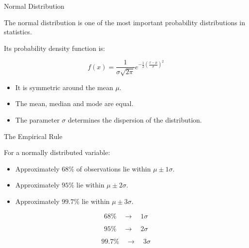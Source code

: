 \documentclass{beamer}
\begin{document}
\begin{frame}{Normal Distribution}

The normal distribution is one of the most important probability distributions in statistics.

\vskip 0.5cm

Its probability density function is:

\[
f(x)=
\frac{1}{\sigma\sqrt{2\pi}}
e^{-\frac{1}{2}
\left(
\frac{x-\mu}{\sigma}
\right)^2}
\]

\vskip 0.5cm

\begin{itemize}

  \item It is symmetric around the mean $\mu$.

  \item The mean, median and mode are equal.

  \item The parameter $\sigma$ determines the dispersion of the distribution.

\end{itemize}

\end{frame}


\begin{frame}{The Empirical Rule}

For a normally distributed variable:

\vskip 0.5cm

\begin{itemize}

  \item Approximately $68\%$ of observations lie within $\mu \pm 1\sigma$.

  \item Approximately $95\%$ lie within $\mu \pm 2\sigma$.

  \item Approximately $99.7\%$ lie within $\mu \pm 3\sigma$.

\end{itemize}

\vskip 0.7cm

\[
68\% \quad \rightarrow \quad 1\sigma
\]

\[
95\% \quad \rightarrow \quad 2\sigma
\]

\[
99.7\% \quad \rightarrow \quad 3\sigma
\]

\end{frame}


\end{document}
